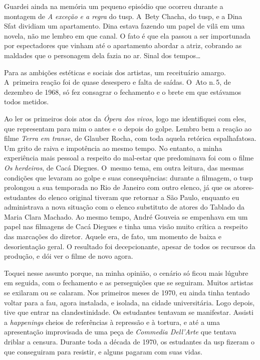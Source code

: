 {Guardei ainda na memória um pequeno episódio que ocorreu durante a montagem de
{\it A exceção e a regra} do {\sc tusp}. A~Bety Chacha, do {\sc tusp}, e a Dina Sfat
dividiam um apartamento. Dina estava fazendo um papel de vilã em uma
novela, não me lembro em que canal. O fato é que ela passou a ser
importunada por espectadores que vinham até o apartamento abordar a
atriz, cobrando as maldades que o personagem dela fazia no ar. Sinal dos
tempos\ldots{}

Para as ambições estéticas e sociais dos artistas, um receituário
amargo. A~primeira reação foi de quase desespero e falta de saídas. O~Ato
n.\,5, de dezembro de 1968, só fez consagrar o fechamento e o brete em
que estávamos todos metidos.

Ao ler os primeiros dois atos da {\it Ópera dos vivos}, logo me
identifiquei com eles, que representam para mim o antes e
o depois do golpe. Lembro bem a reação ao filme {\it Terra em transe}, de
Glauber Rocha, com toda aquela retórica espalhafatosa. Um grito de raiva
e impotência ao mesmo tempo. No entanto, a minha experiência mais
pessoal a respeito do mal-estar que predominava foi com o filme
{\it Os herdeiros}, de Cacá Diegues. O~mesmo tema, em outra leitura, das
mesmas condições que levaram ao golpe e suas consequências: durante a
filmagem, o {\sc tusp} prolongou a sua temporada no Rio de Janeiro com outro
elenco, já que os atores-estudantes do elenco original tiveram que
retornar a São Paulo, enquanto eu administrava a nova situação com o elenco substituto
de atores do Tablado da Maria Clara Machado. Ao mesmo tempo, André
Gouveia se empenhava em um papel nas filmagens de Cacá Diegues
e tinha uma visão muito crítica a respeito das marcações do diretor.
Aquele era, de fato, um momento de baixa e desorientação geral. O
resultado foi decepcionante, apesar de todos os recursos da produção, e
dói ver o filme de novo agora.

Toquei nesse assunto porque, na minha opinião, o cenário só
ficou mais lúgubre em seguida, com o fechamento e as perseguições que se seguiram.
Muitos artistas se exilaram ou se calaram. Nos primeiros meses de 1970,
eu ainda tinha tentado voltar para a {\sc fau}, agora instalada, e isolada, na
cidade universitária. Logo depois, tive que entrar na clandestinidade. Os
estudantes tentavam se manifestar. Assisti a {\it happenings} cheios de
referências à repressão e à tortura, e até a uma apresentação improvisada
de uma peça de {\it Commedia Dell'Arte} que tentava driblar a censura. Durante toda
a década de 1970, os estudantes da {\sc usp} fizeram o que conseguiram para
resistir, e alguns pagaram com suas vidas.

}
